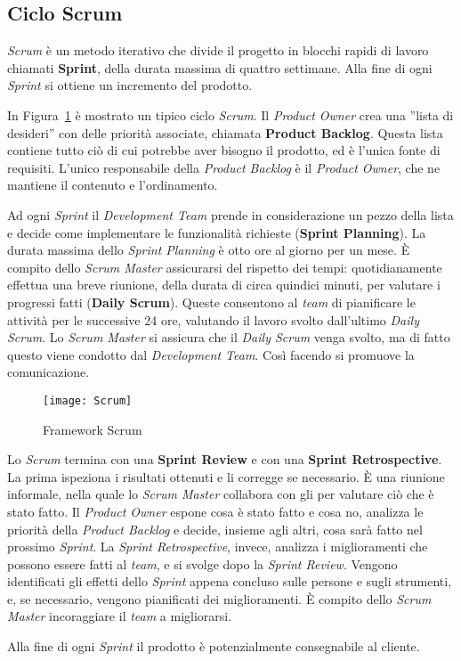 \subsection{Ciclo Scrum}

\textit{Scrum} è un metodo iterativo che divide il progetto in blocchi rapidi di lavoro chiamati \textbf{Sprint}, della durata massima di quattro settimane. Alla fine di ogni \textit{Sprint} si ottiene un incremento del prodotto.

In Figura~\ref{fig:scrum} è mostrato un tipico ciclo \textit{Scrum}. Il \textit{Product Owner} crea una ''lista di desideri'' con delle priorità associate, chiamata \textbf{Product Backlog}. Questa lista contiene tutto ciò di cui potrebbe aver bisogno il prodotto, ed è l'unica fonte di requisiti. L'unico responsabile della \textit{Product Backlog} è il \textit{Product Owner}, che ne mantiene il contenuto e l'ordinamento.

Ad ogni \textit{Sprint} il \textit{Development Team} prende in considerazione un pezzo della lista e decide come implementare le funzionalità richieste (\textbf{Sprint Planning}). La durata massima dello \textit{Sprint Planning} è otto ore al giorno per un mese. È compito dello \textit{Scrum Master} assicurarsi del rispetto dei tempi: quotidianamente effettua una breve riunione, della durata di circa quindici minuti, per valutare i progressi fatti (\textbf{Daily Scrum}). Queste consentono al \textit{team} di pianificare le attività per le successive 24 ore, valutando il lavoro svolto dall'ultimo \textit{Daily Scrum}. Lo \textit{Scrum Master} si assicura che il \textit{Daily Scrum} venga svolto, ma di fatto questo viene condotto dal \textit{Development Team}. Così facendo si promuove la comunicazione.
\begin{figure}[h]
\begin{center}
\texttt{[image: Scrum]}
\caption[Framework \textit{Scrum}]{Framework Scrum\protect\footnotemark}
\label{fig:scrum}
\end{center}
\end{figure}

Lo \textit{\textit{Scrum}} termina con una \textbf{Sprint Review} e con una \textbf{Sprint Retrospective}. La prima ispeziona i risultati ottenuti e li corregge se necessario. È una riunione informale, nella quale lo \textit{Scrum Master} collabora con gli  per valutare ciò che è stato fatto. Il \textit{Product Owner} espone cosa è stato fatto e cosa no, analizza le priorità della \textit{Product Backlog} e decide, insieme agli altri, cosa sarà fatto nel prossimo \textit{Sprint}. La \textit{Sprint Retrospective}, invece, analizza i miglioramenti che possono essere fatti al \textit{team}, e si svolge dopo la \textit{Sprint Review}. Vengono identificati gli effetti dello \textit{Sprint} appena concluso sulle persone e sugli strumenti, e, se necessario, vengono pianificati dei miglioramenti. È compito dello \textit{Scrum Master} incoraggiare il \textit{team} a migliorarsi.

Alla fine di ogni \textit{Sprint} il prodotto è potenzialmente consegnabile al cliente.